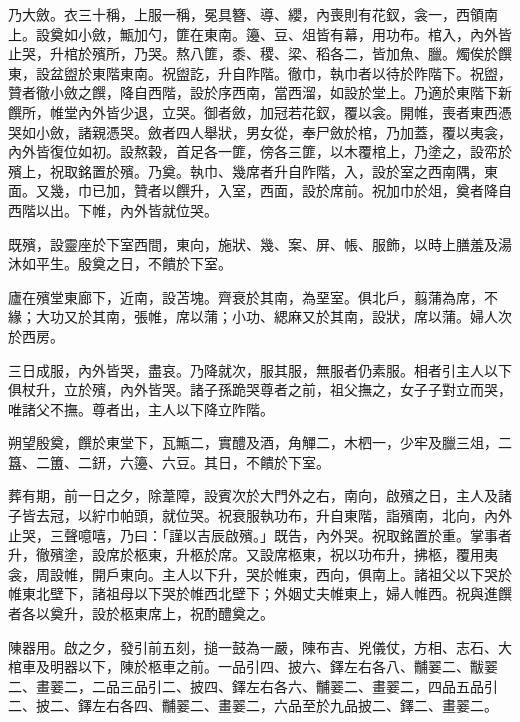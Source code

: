 \begin{pinyinscope}
 乃大斂。衣三十稱，上服一稱，冕具簪、導、纓，內喪則有花釵，衾一，西領南上。設奠如小斂，甒加勺，篚在東南。籩、豆、俎皆有幕，用功布。棺入，內外皆止哭，升棺於殯所，乃哭。熬八篚，黍、稷、梁、稻各二，皆加魚、臘。燭俟於饌東，設盆盥於東階東南。祝盥訖，升自阼階。徹巾，執巾者以待於阼階下。祝盥，贊者徹小斂之饌，降自西階，設於序西南，當西溜，如設於堂上。乃適於東階下新饌所，帷堂內外皆少退，立哭。御者斂，加冠若花釵，覆以衾。開帷，喪者東西憑哭如小斂，諸親憑哭。斂者四人舉狀，男女從，奉尸斂於棺，乃加蓋，覆以夷衾，內外皆復位如初。設熬穀，首足各一篚，傍各三篚，以木覆棺上，乃塗之，設帟於殯上，祝取銘置於殯。乃奠。執巾、幾席者升自阼階，入，設於室之西南隅，東面。又幾，巾已加，贊者以饌升，入室，西面，設於席前。祝加巾於俎，奠者降自西階以出。下帷，內外皆就位哭。



 既殯，設靈座於下室西間，東向，施狀、幾、案、屏、帳、服飾，以時上膳羞及湯沐如平生。殷奠之日，不饋於下室。



 廬在殯堂東廊下，近南，設苫塊。齊衰於其南，為堊室。俱北戶，翦蒲為席，不緣；大功又於其南，張帷，席以蒲；小功、緦麻又於其南，設狀，席以蒲。婦人次於西房。



 三日成服，內外皆哭，盡哀。乃降就次，服其服，無服者仍素服。相者引主人以下俱杖升，立於殯，內外皆哭。諸子孫跪哭尊者之前，祖父撫之，女子子對立而哭，唯諸父不撫。尊者出，主人以下降立阼階。



 朔望殷奠，饌於東堂下，瓦甒二，實醴及酒，角觶二，木柶一，少牢及臘三俎，二簋、二簠、二鈃，六籩、六豆。其日，不饋於下室。



 葬有期，前一日之夕，除葦障，設賓次於大門外之右，南向，啟殯之日，主人及諸子皆去冠，以紵巾帕頭，就位哭。祝衰服執功布，升自東階，詣殯南，北向，內外止哭，三聲噫嘻，乃曰：「謹以吉辰啟殯。」既告，內外哭。祝取銘置於重。掌事者升，徹殯塗，設席於柩東，升柩於席。又設席柩東，祝以功布升，拂柩，覆用夷衾，周設帷，開戶東向。主人以下升，哭於帷東，西向，俱南上。諸祖父以下哭於帷東北壁下，諸祖母以下哭於帷西北壁下；外姻丈夫帷東上，婦人帷西。祝與進饌者各以奠升，設於柩東席上，祝酌醴奠之。



 陳器用。啟之夕，發引前五刻，搥一鼓為一嚴，陳布吉、兇儀仗，方相、志石、大棺車及明器以下，陳於柩車之前。一品引四、披六、鐸左右各八、黼翣二、黻翣二、畫翣二，二品三品引二、披四、鐸左右各六、黼翣二、畫翣二，四品五品引二、披二、鐸左右各四、黼翣二、畫翣二，六品至於九品披二、鐸二、畫翣二。




\end{pinyinscope}
